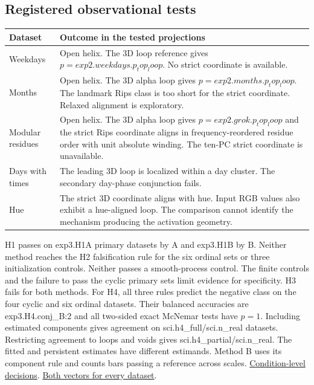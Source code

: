 \documentclass[10pt]{article}
\newcommand{\evidence}[2]{\href{https://github.com/BurnyCoder/topology-of-neural-geometry-in-llm-mechanistic-interpretability/blob/main/#1}{#2}}
\begin{document}
\subsection{Registered observational tests}

\begin{center}\small
\begin{tabular}{p{.17\linewidth}p{.72\linewidth}}\toprule
Dataset & Outcome in the tested projections\\\midrule
Weekdays & Open helix. The 3D loop reference gives $p={{exp2.weekdays.p_top_loop}}$. No strict coordinate is available.\\
Months & Open helix. The 3D alpha loop gives $p={{exp2.months.p_top_loop}}$. The landmark Rips class is too short for the strict coordinate. Relaxed alignment is exploratory.\\
Modular residues & Open helix. The 3D alpha loop gives $p={{exp2.grok.p_top_loop}}$ and the strict Rips coordinate aligns in frequency-reordered residue order with unit absolute winding. The ten-PC strict coordinate is unavailable.\\
Days with times & The leading 3D loop is localized within a day cluster. The secondary day-phase conjunction fails.\\
Hue & The strict 3D coordinate aligns with hue. Input RGB values also exhibit a hue-aligned loop. The comparison cannot identify the mechanism producing the activation geometry.\\\bottomrule
\end{tabular}\end{center}

H1 passes on {{exp3.H1A}} primary datasets by A and {{exp3.H1B}} by B. Neither method reaches the H2 falsification rule for the six ordinal sets or three initialization controls. Neither passes a smooth-process control. The finite controls and the failure to pass the cyclic primary sets limit evidence for specificity. H3 fails for both methods. For H4, all three rules predict the negative class on the four cyclic and six ordinal datasets. Their balanced accuracies are {{exp3.H4.conj_B:2}} and all two-sided exact McNemar tests have $p=1$. Including estimated components gives agreement on {{sci.h4_full}}/{{sci.n_real}} datasets. Restricting agreement to loops and voids gives {{sci.h4_partial}}/{{sci.n_real}}. The fitted and persistent estimates have different estimands. Method B uses its component rule and counts bars passing a reference across scales. \evidence{results/science/decisions.csv}{Condition-level decisions}. \evidence{results/science/h4_datasets.csv}{Both vectors for every dataset}.
\end{document}
